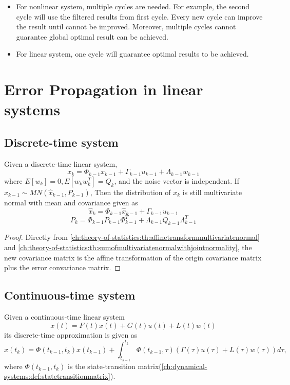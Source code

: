 \begin{refsection}
\begin{remark}\hfill
\begin{itemize}
	\item For nonlinear system, multiple cycles are needed. For example, the second cycle will use the filtered results from first cycle. Every new cycle can improve the result until cannot be improved. Moreover, multiple cycles cannot guarantee global optimal result can be achieved.
	\item For linear system, one cycle will guarantee optimal results to be achieved. 
\end{itemize}
\end{remark}

\section{Error Propagation in linear systems}
\subsection{Discrete-time system}
\begin{theorem}\label{ch:estimation-in-dynamical-systems:th:errorpropogation}\cite[318]{stengel2012optimal}
Given a discrete-time linear system,  
$$x_k = \Phi_{k-1}x_{k-1} + \Gamma_{k-1}u_{k-1} + \Lambda_{k-1}w_{k-1}$$
where $E[w_k] = 0, E[w_kw_k^T] = Q_k$, and the noise vector is independent. If $x_{k-1} \sim MN(\hat{x}_{k-1},P_{k-1})$, 
 Then
the distribution of $x_k$ is still multivariate normal with mean and covariance given as
$$\hat{x}_k = \Phi_{k-1}\hat{x}_{k-1} + \Gamma_{k-1}u_{k-1}$$
$$P_k = \Phi_{k-1}P_{k-1}\Phi_{k-1}^T + \Lambda_{k-1}Q_{k-1}\Lambda_{k-1}^T$$
\end{theorem}
\begin{proof}
Directly from \autoref{ch:theory-of-statistics:th:affinetransformmultivariatenormal} and \autoref{ch:theory-of-statistics:th:sumofmultivariatenormalwithjointnormality}, the new covariance matrix is the affine transformation of the origin covariance matrix plus the error convariance matrix.
\end{proof}

\subsection{Continuous-time system}
\begin{lemma}\cite[326,336]{stengel2012optimal}
Given a continuous-time linear system
$$\dot{x}(t) = F(t)x(t) + G(t)u(t) + L(t)w(t)$$
its discrete-time approximation is given as
$$x(t_k) = \Phi(t_{k-1},t_k)x(t_{k-1}) + \int_{t_{k-1}}^{t_{k} }\Phi(t_{k-1},\tau)(\Gamma(\tau)u(\tau) + L(\tau)w(\tau)) d\tau,$$
where $\Phi(t_{k-1},t_k)$ is the state-transition matrix(\autoref{ch:dynamical-systems:def:statetransitionmatrix}).  


\end{lemma}
\end{refsection}
